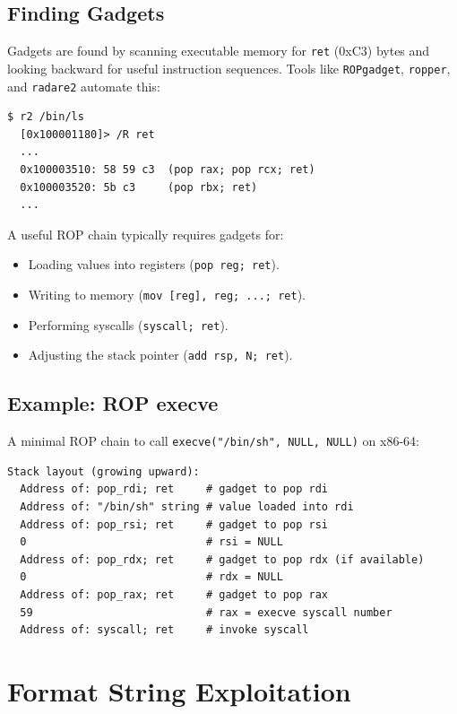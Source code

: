 \subsection{Finding Gadgets}

Gadgets are found by scanning executable memory for \texttt{ret} (0xC3) bytes and looking backward for useful instruction sequences. Tools like \texttt{ROPgadget}, \texttt{ropper}, and \texttt{radare2} automate this:

\begin{lstlisting}[language=Radare2]
  $ r2 /bin/ls
  [0x100001180]> /R ret
  ...
  0x100003510: 58 59 c3  (pop rax; pop rcx; ret)
  0x100003520: 5b c3     (pop rbx; ret)
  ...
\end{lstlisting}

A useful ROP chain typically requires gadgets for:

\begin{itemize}
	\item Loading values into registers (\texttt{pop reg; ret}).
	\item Writing to memory (\texttt{mov [reg], reg; ...; ret}).
	\item Performing syscalls (\texttt{syscall; ret}).
	\item Adjusting the stack pointer (\texttt{add rsp, N; ret}).
\end{itemize}

\subsection{Example: ROP execve}

A minimal ROP chain to call \texttt{execve("/bin/sh", NULL, NULL)} on x86-64:

\begin{lstlisting}[caption=Conceptual ROP chain]
  Stack layout (growing upward):
  Address of: pop_rdi; ret     # gadget to pop rdi
  Address of: "/bin/sh" string # value loaded into rdi
  Address of: pop_rsi; ret     # gadget to pop rsi
  0                            # rsi = NULL
  Address of: pop_rdx; ret     # gadget to pop rdx (if available)
  0                            # rdx = NULL
  Address of: pop_rax; ret     # gadget to pop rax
  59                           # rax = execve syscall number
  Address of: syscall; ret     # invoke syscall
\end{lstlisting}

\section{Format String Exploitation}

